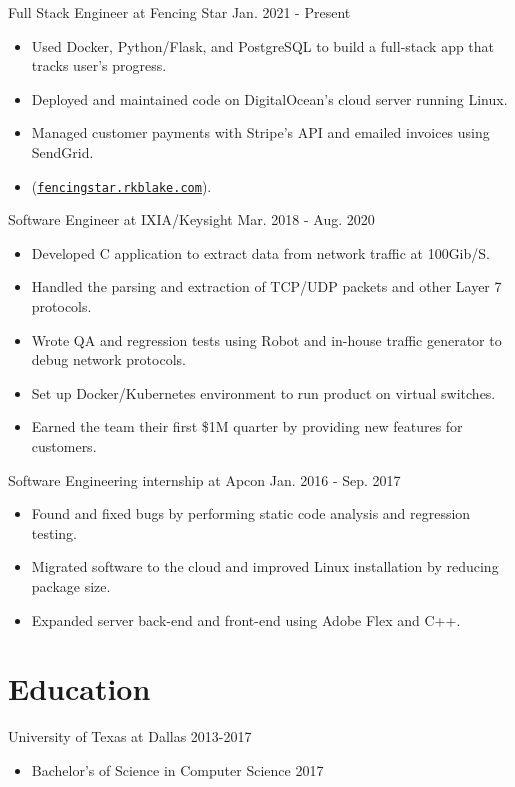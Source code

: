 \documentclass[line,margin]{res}
\begin{document}
\begin{resume}
Full Stack Engineer at Fencing Star
\hfill Jan. 2021 - Present
\begin{itemize} \itemsep -2pt
	\item Used Docker, Python/Flask, and PostgreSQL to build a full-stack app that tracks user's progress.
	\item Deployed and maintained code on DigitalOcean's cloud server running Linux.
	\item Managed customer payments with Stripe's API and emailed invoices using SendGrid.
	\item (\href{https://fencingstar.rkblake.com}{\texttt{fencingstar.rkblake.com}}).
\end{itemize}
\vspace{-8pt}
Software Engineer at IXIA/Keysight
\hfill Mar. 2018 - Aug. 2020
	\begin{itemize} \itemsep -2pt
	\item Developed C application to extract data from network traffic at 100Gib/S.
	\item Handled the parsing and extraction of TCP/UDP packets and other Layer 7 protocols.
	\item Wrote QA and regression tests using Robot and in-house traffic generator to debug network protocols.
	\item Set up Docker/Kubernetes environment to run product on virtual switches.
	\item Earned the team their first \$1M quarter by providing new features for customers.
	\end{itemize}
\vspace{-8pt}
Software Engineering internship at Apcon
\hfill  Jan. 2016 - Sep. 2017
\begin{itemize} \itemsep -2pt
	\item Found and fixed bugs by performing static code analysis and regression testing.
	\item Migrated software to the cloud and improved Linux installation by reducing package size.
	\item Expanded server back-end and front-end using Adobe Flex and C++.

	\end{itemize}

\vspace{-4pt}
\section{Education}
\vspace{12pt}
University of Texas at Dallas \hfill 2013-2017 \\
\vspace{-12pt}
\begin{itemize} \itemsep -2pt
	\item Bachelor's of Science in Computer Science 2017
\end{itemize}


\end{resume}
\end{document}

